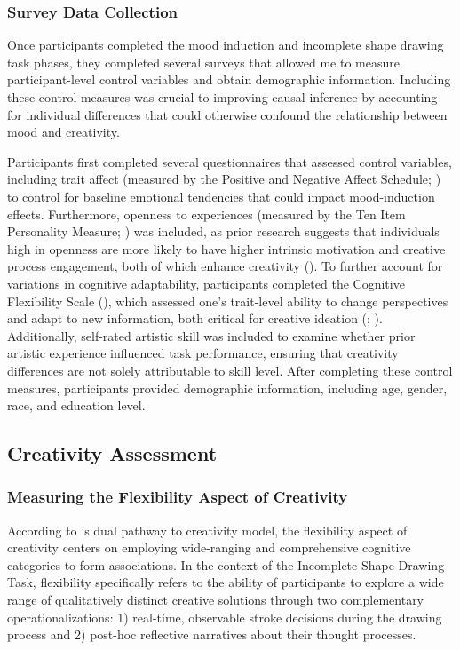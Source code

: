 \documentclass[../MA_Thesis.tex]{subfiles}
\begin{document}
\subsubsection*{Survey Data Collection}
Once participants completed the mood induction and incomplete shape drawing task phases, they completed several surveys that allowed me to measure participant-level control variables and obtain demographic information. Including these control measures was crucial to improving causal inference by accounting for individual differences that could otherwise confound the relationship between mood and creativity.

Participants first completed several questionnaires that assessed control variables, including trait affect (measured by the Positive and Negative Affect Schedule; \cite{watson_development_1988}) to control for baseline emotional tendencies that could impact mood-induction effects. Furthermore, openness to experiences (measured by the Ten Item Personality Measure; \cite{gosling_very_2003}) was included, as prior research suggests that individuals high in openness are more likely to have higher intrinsic motivation and creative process engagement, both of which enhance creativity (\cite{tan_openness_2019}). To further account for variations in cognitive adaptability, participants completed the Cognitive Flexibility Scale (\cite{martin_new_1995}), which assessed one's trait-level ability to change perspectives and adapt to new information, both critical for creative ideation (\cite{lin_how_2014}; \cite{muller_concentrative_2016}). Additionally, self-rated artistic skill was included to examine whether prior artistic experience influenced task performance, ensuring that creativity differences are not solely attributable to skill level. After completing these control measures, participants provided demographic information, including age, gender, race, and education level. 

\subsection*{Creativity Assessment}
\subsubsection*{Measuring the Flexibility Aspect of Creativity}
According to \textcite{nijstad_dual_2010}'s dual pathway to creativity model, the flexibility aspect of creativity centers on employing wide-ranging and comprehensive cognitive categories to form associations. In the context of the Incomplete Shape Drawing Task, flexibility specifically refers to the ability of participants to explore a wide range of qualitatively distinct creative solutions through two complementary operationalizations: 1) real-time, observable stroke decisions during the drawing process and 2) post-hoc reflective narratives about their thought processes.
\end{document}
